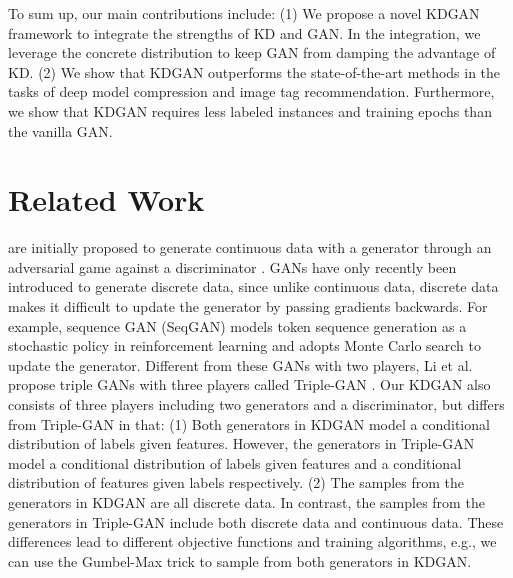 \documentclass{article}
\begin{document}
To sum up, our main contributions include:
(1) We propose a novel KDGAN framework to integrate the strengths of KD and GAN.
In the integration, we leverage the concrete distribution to keep GAN from damping the advantage of KD.
(2) We show that KDGAN outperforms the state-of-the-art methods in the tasks of deep model compression and image tag recommendation.
Furthermore, we show that KDGAN requires less labeled instances and training epochs than the vanilla GAN.


\section{Related Work}


 are initially proposed to generate continuous data with a generator through an adversarial game against a discriminator \cite{goodfellow2014generative}.
GANs have only recently been introduced to generate discrete data, since unlike continuous data, discrete data makes it difficult to update the generator by passing gradients backwards.
For example, sequence GAN (SeqGAN) \cite{yu2017seqgan} models token sequence generation as a stochastic policy in reinforcement learning and adopts Monte Carlo search to update the generator.
Different from these GANs with two players, Li et al. propose triple GANs with three players called Triple-GAN \cite{chongxuan2017triple}.
Our KDGAN also consists of three players including two generators and a discriminator, but differs from Triple-GAN in that:
(1) Both generators in KDGAN model a conditional distribution of labels given features.
However, the generators in Triple-GAN model a conditional distribution of labels given features and a conditional distribution of features given labels respectively.
(2) The samples from the generators in KDGAN are all discrete data.
In contrast, the samples from the generators in Triple-GAN include both discrete data and continuous data.
These differences lead to different objective functions and training algorithms, e.g., we can use the Gumbel-Max trick \cite{gumbelstatistical,maddison2014sampling} to sample from both generators in KDGAN.
\end{document}
